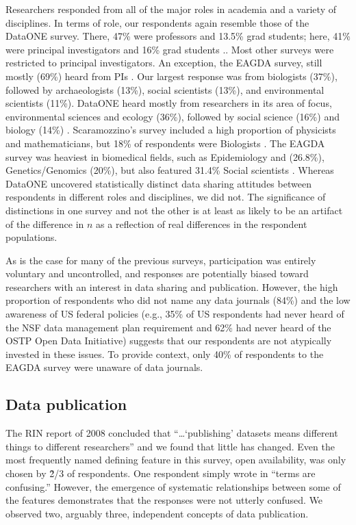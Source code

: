 \documentclass[10pt]{article}
\begin{document}
Researchers responded from all of the major roles in academia and a variety of disciplines.
In terms of role, our respondents again resemble those of the DataONE survey.
There, 47\% were professors and 13.5\% grad students; here, 41\% were principal investigators and 16\% grad students \cite{tenopir_data_2011}..
Most other surveys were restricted to principal investigators.
An exception, the EAGDA survey, still mostly (69\%) heard from PIs \cite{bobrow_establishing_2014}.
Our largest response was from biologists (37\%), followed by archaeologists (13\%), social scientists (13\%), and environmental scientists (11\%). 
DataONE heard mostly from researchers in its area of focus, environmental sciences and ecology (36\%), followed by social science (16\%) and biology (14\%) \cite{tenopir_data_2011}. 
Scaramozzino's survey included a high proportion of physicists and mathematicians, but 18\% of respondents were Biologists \cite{scaramozzino_study_2012}.
The EAGDA survey was heaviest in biomedical fields, such as Epidemiology and (26.8\%), Genetics/Genomics (20\%), but also featured 31.4\% Social scientists \cite{bobrow_establishing_2014}. 
Whereas DataONE uncovered statistically distinct data sharing attitudes between respondents in different roles and disciplines, we did not.
The significance of distinctions in one survey and not the other is at least as likely to be an artifact of the difference in $n$ as a reflection of real differences in the respondent populations.

As is the case for many of the previous surveys, participation was entirely voluntary and uncontrolled, and responses are potentially biased toward researchers with an interest in data sharing and publication.
However, the high proportion of respondents who did not name any data journals (84\%) and the low awareness of US federal policies (e.g., 35\% of US respondents had never heard of the NSF data management plan requirement and 62\% had never heard of the OSTP Open Data Initiative) suggests that our respondents are not atypically invested in these issues.
To provide context, only 40\% of respondents to the EAGDA survey were unaware of data journals.

\subsection*{Data publication}

The RIN report of 2008 concluded that ``\ldots`publishing' datasets means different things to different researchers'' \cite{swan_share_2008} and we found that little has changed.
Even the most frequently named defining feature in this survey, open availability, was only chosen by \~2/3 of respondents.
One respondent simply wrote in ``terms are confusing.''
However, the emergence of systematic relationships between some of the features demonstrates that the responses were not utterly confused.
We observed two, arguably three, independent concepts of data publication.
\end{document}
